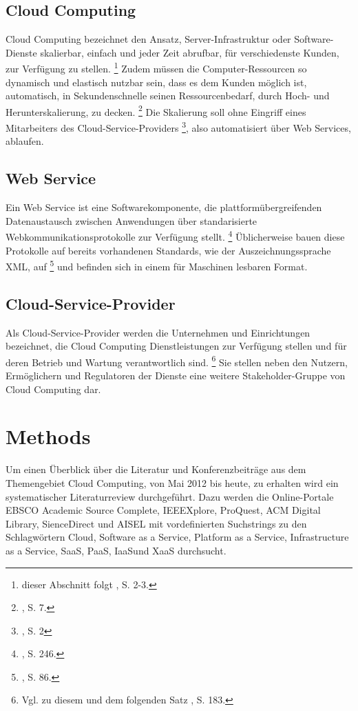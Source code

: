 \documentclass[
	a4paper,
	oneside,
	12pt,
	liststotocnumbered
]{article}
\let\cite\textcite
\begin{document}
\subsection{Cloud Computing}
Cloud Computing bezeichnet den Ansatz, Server-Infrastruktur oder Software-Dienste skalierbar, einfach und jeder Zeit abrufbar, für verschiedenste Kunden, zur Verfügung zu stellen.
\footnote{dieser Abschnitt folgt \cite{Mell.2011}, S. 2-3.}
Zudem müssen die Computer-Ressourcen so dynamisch und elastisch nutzbar sein, dass es dem Kunden möglich ist, automatisch, in Sekundenschnelle seinen Ressourcenbedarf, durch Hoch- und Herunterskalierung, zu decken.
\footnote{\cite{Boss.2007}, S. 7.}
Die Skalierung soll ohne Eingriff eines Mitarbeiters des Cloud-Service-Providers
\footnote{\cite{Mell.2011}, S. 2}, also automatisiert über Web Services, ablaufen.

\subsection{Web Service}
Ein Web Service ist eine Softwarekomponente, die plattformübergreifenden Datenaustausch zwischen Anwendungen über standarisierte Webkommunikationsprotokolle zur Verfügung stellt.
\footnote{\cite{Laudon.2010}, S. 246.}
Üblicherweise bauen diese Protokolle auf bereits vorhandenen Standards, wie der Auszeichnungssprache \acs{XML}, auf
\footnote{\cite{Curbera.2002}, S. 86.}  
und befinden sich in einem für Maschinen lesbaren Format.

\subsection{Cloud-Service-Provider}
Als Cloud-Service-Provider werden die Unternehmen und Einrichtungen bezeichnet, die Cloud Computing Dienstleistungen zur Verfügung stellen und für deren Betrieb und Wartung verantwortlich sind.
\footnote{Vgl. zu diesem und dem folgenden Satz \cite{Marston.2011}, S. 183.} 
Sie stellen neben den Nutzern, Ermöglichern und Regulatoren der Dienste eine weitere Stakeholder-Gruppe von Cloud Computing dar.


\section{Methods}
Um einen Überblick über die Literatur und Konferenzbeiträge aus dem Themengebiet Cloud Computing, von Mai 2012 bis heute, zu erhalten wird ein systematischer Literaturreview durchgeführt. Dazu werden die Online-Portale EBSCO Academic Source Complete, IEEEXplore, ProQuest, ACM Digital Library, SienceDirect und AISEL mit vordefinierten Suchstrings zu den Schlagwörtern 
\glqq Cloud\grqq,
\glqq Software as a Service\grqq,
\glqq Platform as a Service\grqq,
\glqq Infrastructure as a Service\grqq,
\glqq \acs{SaaS}\grqq,
\glqq \acs{PaaS}\grqq,
\glqq \acs{IaaS}\grqq\addspace und
\glqq \acs{XaaS}\grqq
durchsucht.
\end{document}

